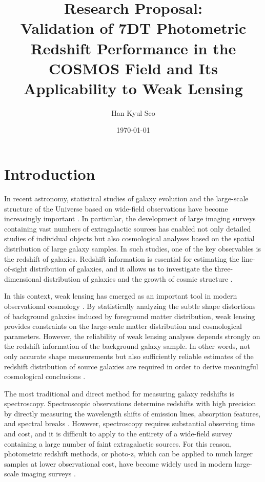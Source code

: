 \documentclass[11pt]{article}
\title{ \Large Research Proposal: \\
 Validation of 7DT Photometric Redshift Performance in the COSMOS Field and Its Applicability to Weak Lensing}
\author{Han Kyul Seo}
\date{\today}
\let\cite\citep
\begin{document}
\maketitle

\section{Introduction}

In recent astronomy, statistical studies of galaxy evolution and the large-scale structure of the Universe based on wide-field observations have become increasingly important \cite{weinberg2013observational}. In particular, the development of large imaging surveys containing vast numbers of extragalactic sources has enabled not only detailed studies of individual objects but also cosmological analyses based on the spatial distribution of large galaxy samples. In such studies, one of the key observables is the redshift of galaxies. Redshift information is essential for estimating the line-of-sight distribution of galaxies, and it allows us to investigate the three-dimensional distribution of galaxies and the growth of cosmic structure \cite{hamilton1998linear}.

In this context, weak lensing has emerged as an important tool in modern observational cosmology \cite{Mandelbaum2018}. By statistically analyzing the subtle shape distortions of background galaxies induced by foreground matter distribution, weak lensing provides constraints on the large-scale matter distribution and cosmological parameters. However, the reliability of weak lensing analyses depends strongly on the redshift information of the background galaxy sample. In other words, not only accurate shape measurements but also sufficiently reliable estimates of the redshift distribution of source galaxies are required in order to derive meaningful cosmological conclusions \cite{Salvato2019,Huterer2013}.

The most traditional and direct method for measuring galaxy redshifts is spectroscopy. Spectroscopic observations determine redshifts with high precision by directly measuring the wavelength shifts of emission lines, absorption features, and spectral breaks \cite{Salvato2019}. However, spectroscopy requires substantial observing time and cost, and it is difficult to apply to the entirety of a wide-field survey containing a large number of faint extragalactic sources. For this reason, photometric redshift methods, or photo-z, which can be applied to much larger samples at lower observational cost, have become widely used in modern large-scale imaging surveys \cite{Salvato2019}.
\end{document}
